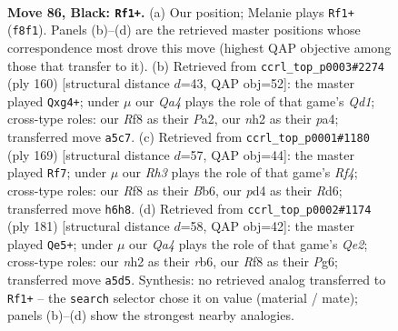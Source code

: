 \documentclass[11pt]{article}
\begin{document}
\clearpage

\begin{figure}[p]\centering
\begin{subfigure}{0.46\textwidth}\centering
\resizebox{\linewidth}{!}{%
\newchessgame
\chessboard[
  setfen={4kr2/p5Q1/7r/q6P/3P4/4P3/7N/4b2K b - - 0 86},
  showmover=false,
  pgfstyle=straightmove, color=movearrow, markmove={f8-f1}
]}
\caption{}
\end{subfigure}\hfill
\begin{subfigure}{0.46\textwidth}\centering
\resizebox{\linewidth}{!}{%
\newchessgame
\chessboard[
  setfen={2q5/3R1pk1/8/4p3/p5p1/8/P6p/K2Q4 w - - 0 81},
  showmover=false,
  pgfstyle=straightmove, color=movearrow, markmove={d1-g4}
]}
\caption{}
\end{subfigure}
\\[4pt]
\begin{subfigure}{0.46\textwidth}\centering
\resizebox{\linewidth}{!}{%
\newchessgame
\chessboard[
  setfen={8/4k2Q/1b1r4/5r1p/P4P2/5BK1/8/8 b - - 7 85},
  showmover=false,
  pgfstyle=straightmove, color=movearrow, markmove={f5-f7}
]}
\caption{}
\end{subfigure}\hfill
\begin{subfigure}{0.46\textwidth}\centering
\resizebox{\linewidth}{!}{%
\newchessgame
\chessboard[
  setfen={1rQ5/1P2q2k/1R4p1/1K3p2/8/3P4/8/8 b - - 31 91},
  showmover=false,
  pgfstyle=straightmove, color=movearrow, markmove={e7-e5}
]}
\caption{}
\end{subfigure}
\caption{\textbf{Move 86, Black: \texttt{Rf1+}.} (a) Our position; Melanie plays \texttt{Rf1+} (\texttt{f8f1}). Panels (b)--(d) are the retrieved master positions whose correspondence most drove this move (highest QAP objective among those that transfer to it). (b) Retrieved from \texttt{ccrl\_top\_p0003\#2274} (ply 160) [structural distance $d$=43, QAP obj=52]: the master played \texttt{Qxg4+}; under $\mu$ our \emph{Qa4} plays the role of that game's \emph{Qd1}; cross-type roles: our \emph{R}f8 as their \emph{P}a2, our \emph{n}h2 as their \emph{p}a4; transferred move \texttt{a5c7}. (c) Retrieved from \texttt{ccrl\_top\_p0001\#1180} (ply 169) [structural distance $d$=57, QAP obj=44]: the master played \texttt{Rf7}; under $\mu$ our \emph{Rh3} plays the role of that game's \emph{Rf4}; cross-type roles: our \emph{R}f8 as their \emph{B}b6, our \emph{p}d4 as their \emph{R}d6; transferred move \texttt{h6h8}. (d) Retrieved from \texttt{ccrl\_top\_p0002\#1174} (ply 181) [structural distance $d$=58, QAP obj=42]: the master played \texttt{Qe5+}; under $\mu$ our \emph{Qa4} plays the role of that game's \emph{Qe2}; cross-type roles: our \emph{n}h2 as their \emph{r}b6, our \emph{R}f8 as their \emph{P}g6; transferred move \texttt{a5d5}. Synthesis: no retrieved analog transferred to \texttt{Rf1+} -- the \texttt{search} selector chose it on value (material / mate); panels (b)--(d) show the strongest nearby analogies.}
\label{fig:thought-m171}
\end{figure}
\end{document}
